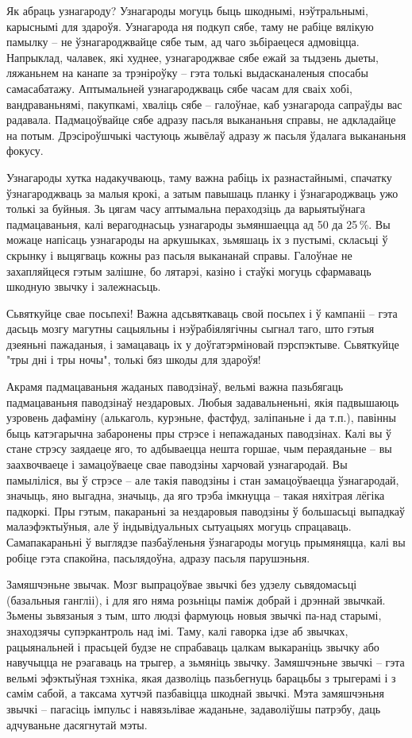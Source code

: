 Як абраць узнагароду? Узнагароды могуць быць шкоднымі, нэўтральнымі, карыснымі для здароўя. Узнагарода ня подкуп сябе, таму не рабіце вялікую памылку – не ўзнагароджвайце сябе тым, ад чаго зьбіраецеся адмовіцца. Напрыклад, чалавек, які худнее, узнагароджвае сябе ежай за тыдзень дыеты, ляжаньнем на канапе за трэніроўку – гэта толькі выдасканаленыя спосабы самасабатажу. Аптымальней узнагароджваць сябе часам для сваіх хобі, вандраваньнямі, пакупкамі, хваліць сябе – галоўнае, каб узнагарода сапраўды вас радавала. Падмацоўвайце сябе адразу пасьля выкананьня справы, не адкладайце на потым. Дрэсіроўшчыкі частуюць жывёлаў адразу ж пасьля ўдалага выкананьня фокусу.

Узнагароды хутка надакучваюць, таму важна рабіць іх разнастайнымі, спачатку ўзнагароджваць за малыя крокі, а затым павышаць планку і ўзнагароджваць ужо толькі за буйныя. Зь цягам часу аптымальна пераходзіць да варыятыўнага падмацаваньня, калі верагоднасьць узнагароды зьмяншаецца ад 50 да 25\,\%. Вы можаце напісаць узнагароды на аркушыках, зьмяшаць іх з пустымі, скласьці ў скрынку і выцягваць кожны раз пасьля выкананай справы. Галоўнае не захапляйцеся гэтым залішне, бо лятарэі, казіно і стаўкі могуць сфармаваць шкодную звычку і залежнасьць.

Сьвяткуйце свае посьпехі! Важна адсьвяткаваць свой посьпех і ў кампаніі – гэта дасьць мозгу магутны сацыяльны і нэўрабіялягічны сыгнал таго, што гэтыя дзеяньні пажаданыя, і замацаваць іх у доўгатэрміновай пэрспэктыве. Сьвяткуйце "тры дні і тры ночы", толькі бяз шкоды для здароўя!

Акрамя падмацаваньня жаданых паводзінаў, вельмі важна пазьбягаць падмацаваньня паводзінаў нездаровых. Любыя задавальненьні, якія падвышаюць узровень дафаміну (алькаголь, курэньне, фастфуд, заліпаньне і да т.п.), павінны быць катэгарычна забаронены пры стрэсе і непажаданых паводзінах. Калі вы ў стане стрэсу заядаеце яго, то адбываецца нешта горшае, чым пераяданьне – вы заахвочваеце і замацоўваеце свае паводзіны харчовай узнагародай. Вы памыліліся, вы ў стрэсе – але такія паводзіны і стан замацоўваецца ўзнагародай, значыць, яно выгадна, значыць, да яго трэба імкнуцца – такая няхітрая лёгіка падкоркі. Пры гэтым, пакараньні за нездаровыя паводзіны ў большасьці выпадкаў малаэфэктыўныя, але ў індывідуальных сытуацыях могуць спрацаваць. Самапакараньні ў выглядзе пазбаўленьня ўзнагароды могуць прымяняцца, калі вы робіце гэта спакойна, пасьлядоўна, адразу пасьля парушэньня.

Замяшчэньне звычак. Мозг выпрацоўвае звычкі без удзелу сьвядомасьці (базальныя гангліі), і для яго няма розьніцы паміж добрай і дрэннай звычкай. Зьмены зьвязаныя з тым, што людзі фармуюць новыя звычкі па-над старымі, знаходзячы супэркантроль над імі. Таму, калі гаворка ідзе аб звычках, рацыянальней і прасьцей будзе не спрабаваць цалкам выкараніць звычку або навучыцца не рэагаваць на трыгер, а зьмяніць звычку. Замяшчэньне звычкі – гэта вельмі эфэктыўная тэхніка, якая дазволіць пазьбегнуць барацьбы з трыгерамі і з самім сабой, а таксама хутчэй пазбавіцца шкоднай звычкі. Мэта замяшчэньня звычкі – пагасіць імпульс і навязьлівае жаданьне, задаволіўшы патрэбу, даць адчуваньне дасягнутай мэты.

